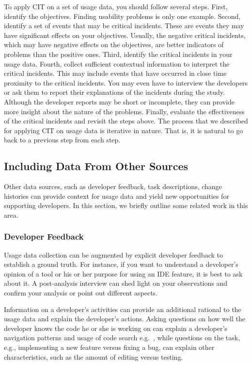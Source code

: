 To apply CIT on a set of usage data, you should follow several steps. First,
identify the objectives. Finding usability problems is only one example.
Second, identify a set of events that may be critical incidents. These are
events they may have significant effects on your objectives. Usually, the
negative critical incidents, which may have negative effects on the objectives,
are better indicators of problems than the positive ones. Third, identify the
critical incidents in your usage data. Fourth, collect sufficient contextual
information to interpret the critical incidents. This may include events that
have occurred in close time proximity to the critical incidents. You may even
have to interview the developers or ask them to report their explanations of the
incidents during the study. Although the developer reports may be short or
incomplete, they can provide more insight about the nature of the problems.
Finally, evaluate the effectiveness of the critical incidents and revisit the
steps above. The process that we described for applying CIT on usage data is
iterative in nature. That is, it is natural to go back to a previous step from
each step.

\label{sec:IncludingOtherSources}
\subsection{Including Data From Other Sources}


Other data sources, such as developer feedback, task descriptions, change histories can provide context for usage data and yield new opportunities for supporting developers. In this section, we briefly outline some related work in this area.

\subsubsection{Developer Feedback}

Usage data collection can be augmented by explicit developer feedback to establish a ground truth. For instance, if you want to understand a developer's opinion of a tool or his or her purpose for using an IDE feature, it is best to ask about it. A post-analysis interview can shed light on your observations and confirm your analysis or point out different aspects.

Information on a developer's activities can provide an additional rational to the usage data and explain the developer's actions. Asking questions on how well the developer knows the code he or she is working on can explain a developer's navigation patterns and usage of code search e.g.~\citep{SnipesExperiencesGamifyingSoftwareDevelopment}, while questions on the task, e.g., implementing a new feature versus fixing a bug, can explain other characteristics, such as the amount of editing versus testing.

